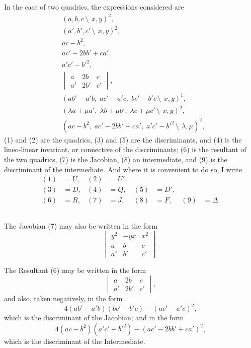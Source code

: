 \documentclass[12pt,a4paper]{article}
\begin{document}
\subsection{}

In the case of two quadrics, the expressions considered are
\begin{align}
&(a, b, c\,\setminus\!\!\:\, x, y)^2, \tag{1}\\
&(a', b', c'\,\setminus\!\!\:\, x, y)^2, \tag{2}\\
&ac - b^2, \tag{3}\\
&ac' - 2bb' + ca', \tag{4}\\
&a'c' - b'^2, \tag{5}\\
&\begin{vmatrix}
a & 2b & c \\
a' & 2b' & c'
\end{vmatrix}, \tag{6}\\
&(ab' - a'b,\; ac' - a'c,\; bc' - b'c\,\setminus\!\!\:\, x, y)^1, \tag{7}\\
&(\lambda a + \mu a',\; \lambda b + \mu b',\; \lambda c + \mu c'\,\setminus\!\!\:\, x, y)^2, \tag{8}\\
&(ac - b^2,\; ac' - 2bb' + ca',\; a'c' - b'^2\,\setminus\!\!\:\, \lambda, \mu)^2, \tag{9}
\end{align}
(1) and (2) are the quadrics, (3) and (5) are the discriminants, and (4) is the lineo-linear invariant, or connective of the discriminants; (6) is the resultant of the two quadrics, (7) is the Jacobian, (8) an intermediate, and (9) is the discriminant of the intermediate. And where it is convenient to do so, I write
\begin{align*}
(1) &= U, & (2) &= U',\\
(3) &= D, & (4) &= Q, & (5) &= D',\\
(6) &= R, & (7) &= J, & (8) &= F, & (9) &= \Delta.
\end{align*}

\subsection{}

The Jacobian (7) may also be written in the form
\[
\begin{vmatrix}
y^2 & -yx & x^2 \\
a & b & c \\
a' & b' & c'
\end{vmatrix}.
\]

The Resultant (6) may be written in the form
\[
\begin{vmatrix}
a & 2b & c \\
a' & 2b' & c'
\end{vmatrix},
\]
and also, taken negatively, in the form
\[
4(ab' - a'b)(bc' - b'c) - (ac' - a'c)^2,
\]
which is the discriminant of the Jacobian; and in the form
\[
4(ac - b^2)(a'c' - b'^2) - (ac' - 2bb' + ca')^2,
\]
which is the discriminant of the Intermediate.
\end{document}
